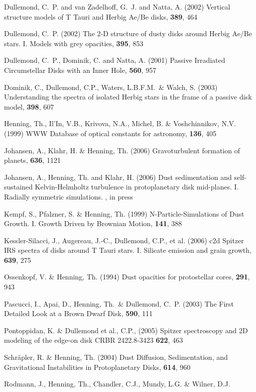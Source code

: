 \begin{ownpubl}
\item {Dullemond}, C.~P. and {van Zadelhoff}, G.~J. and {Natta}, A.
  (2002) Vertical structure models of T Tauri and Herbig Ae/Be disks,
  \aap \textbf{389}, 464 
\item {Dullemond}, C.~P. (2002) The 2-D structure of dusty disks around
  Herbig Ae/Be stars. I.  Models with grey opacities, \aap \textbf{395}, 853
\item {Dullemond}, C.~P., {Dominik}, C. and {Natta}, A. (2001)
  Passive Irradiated Circumstellar Disks with an Inner Hole, \apj
  \textbf{560}, 957
\item Dominik, C., Dullemond, C.P., Waters, L.B.F.M.~\& Walch, S. (2003)
  Understanding the spectra of isolated Herbig stars in the frame of a passive
  disk model, \aap \textbf{398}, 607
\item Henning, Th., Il'In, V.B., Krivova, N.A., Michel, B. \& Voshchinnikov,
  N.V. (1999) WWW Database of optical constants for astronomy, 
  \aaps \textbf{136}, 405
\item Johansen, A., Klahr, H. \& Henning, Th. (2006) Gravoturbulent 
  formation of planets, \apj \textbf{636}, 1121
\item Johansen, A., Henning, Th. and  Klahr, H. (2006) 
  Dust sedimentation and self-sustained Kelvin-Helmholtz turbulence
  in protoplanetary disk mid-planes. 
  I. Radially symmetric simulations. \apj, in press
\item Kempf, S., Pfalzner, S. \& Henning, Th. (1999) N-Particle-Simulations
  of Dust Growth. I. Growth Driven by Brownian Motion, \ica \textbf{141}, 388 
\item Kessler-Silacci, J., Augereau, J.-C., Dullemond, C.P., et al. (2006)
  c2d Spitzer IRS spectra of disks around T Tauri stars. I. Silicate emission
  and grain growth, \apj \textbf{639}, 275
\item Ossenkopf, V. \& Henning, Th. (1994) Dust opacities for protostellar
  cores, \aap \textbf{291}, 943
\item Pascucci, I., Apai, D., Henning, Th.~\& Dullemond, C.~P. (2003) The
  First Detailed Look at a Brown Dwarf Disk, \apjl \textbf{590}, 111
\item Pontoppidan, K. \& Dullemond et al., C.P., (2005) Spitzer spectroscopy
  and 2D modeling of the edge-on disk CRBR 2422.8-3423 \apj \textbf{622}, 463
\item Schr\"apler, R. \& Henning, Th. (2004) Dust Diffusion, Sedimentation,
  and Gravitational Instabilities in Protoplanetary Disks, 
  \apj \textbf{614}, 960
\item Rodmann, J., Henning, Th., Chandler, C.J., Mundy, L.G. \& Wilner, D.J.

\end{ownpubl}
